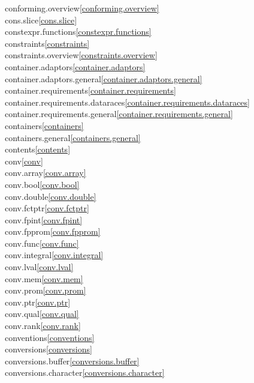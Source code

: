 \begin{multicols}{2}
conforming.overview\quad\ref{conforming.overview}\\
cons.slice\quad\ref{cons.slice}\\
constexpr.functions\quad\ref{constexpr.functions}\\
constraints\quad\ref{constraints}\\
constraints.overview\quad\ref{constraints.overview}\\
container.adaptors\quad\ref{container.adaptors}\\
container.adaptors.general\quad\ref{container.adaptors.general}\\
container.requirements\quad\ref{container.requirements}\\
container.requirements.dataraces\quad\ref{container.requirements.dataraces}\\
container.requirements.general\quad\ref{container.requirements.general}\\
containers\quad\ref{containers}\\
containers.general\quad\ref{containers.general}\\
contents\quad\ref{contents}\\
conv\quad\ref{conv}\\
conv.array\quad\ref{conv.array}\\
conv.bool\quad\ref{conv.bool}\\
conv.double\quad\ref{conv.double}\\
conv.fctptr\quad\ref{conv.fctptr}\\
conv.fpint\quad\ref{conv.fpint}\\
conv.fpprom\quad\ref{conv.fpprom}\\
conv.func\quad\ref{conv.func}\\
conv.integral\quad\ref{conv.integral}\\
conv.lval\quad\ref{conv.lval}\\
conv.mem\quad\ref{conv.mem}\\
conv.prom\quad\ref{conv.prom}\\
conv.ptr\quad\ref{conv.ptr}\\
conv.qual\quad\ref{conv.qual}\\
conv.rank\quad\ref{conv.rank}\\
conventions\quad\ref{conventions}\\
conversions\quad\ref{conversions}\\
conversions.buffer\quad\ref{conversions.buffer}\\
conversions.character\quad\ref{conversions.character}\\

\end{multicols}
